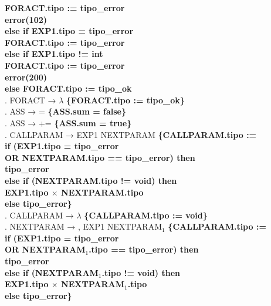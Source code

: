 \begin{tabbing}
    \> \> \> \textbf{FORACT.tipo := tipo\_error}\\
    \> \> \> \textbf{error(102)}\\
    \> \> \textbf{else if EXP1.tipo = tipo\_error}\\
    \> \> \> \textbf{FORACT.tipo := tipo\_error}\\
    \> \> \textbf{else if EXP1.tipo != int} \\
        \> \> \> \textbf{FORACT.tipo := tipo\_error}\\
    \> \> \> \textbf{error(200)}\\
    \> \> \textbf{else FORACT.tipo := tipo\_ok}\\
    . FORACT → $\lambda$ \textbf{\{FORACT.tipo := tipo\_ok\}}\\
    . ASS → = \textbf{\{ASS.sum = false\}}\\
    . ASS → += \textbf{\{ASS.sum = true\}}\\
    . CALLPARAM → EXP1 NEXTPARAM \textbf{\{CALLPARAM.tipo :=}\\
    \>                    \> \textbf{if (EXP1.tipo = tipo\_error}\\
    \>                    \> \textbf{OR NEXTPARAM.tipo == tipo\_error) then}\\
    \>                    \> \> \textbf{tipo\_error}\\
    \>                    \> \textbf{else if (NEXTPARAM.tipo != void) then}\\
    \>                    \> \>\textbf{EXP1.tipo $\times$ NEXTPARAM.tipo}\\
    \>                    \> \textbf{else tipo\_error\}}\\ 
    . CALLPARAM → $\lambda$ \textbf{\{CALLPARAM.tipo := void\}}\\
    . NEXTPARAM → , EXP1 NEXTPARAM$_1$ \textbf{\{CALLPARAM.tipo :=}\\
    \>                    \> \textbf{if (EXP1.tipo = tipo\_error}\\
    \>                    \> \textbf{OR NEXTPARAM$_1$.tipo == tipo\_error) then}\\
    \>                    \> \> \textbf{tipo\_error}\\
    \>                    \> \textbf{else if (NEXTPARAM$_1$.tipo != void) then}\\
    \>                    \> \>\textbf{EXP1.tipo $\times$ NEXTPARAM$_1$.tipo}\\
    \>                    \> \textbf{else tipo\_error\}}\\ 

\end{tabbing}
